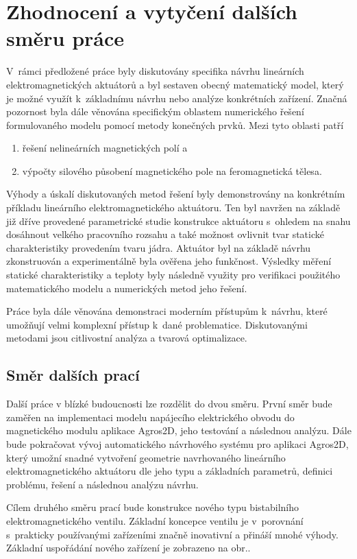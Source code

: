 \chapter{Zhodnocení a vytyčení dalších směru práce}
V~rámci předložené práce byly diskutovány specifika návrhu lineárních elektromagnetických aktuátorů a byl sestaven obecný matematický model, který je možné využít k~základnímu návrhu nebo analýze konkrétních zařízení. Značná pozornost byla dále věnována specifickým oblastem numerického řešení formulovaného modelu pomocí metody konečných prvků. Mezi tyto oblasti patří
\begin{enumerate}[a]
    \item řešení nelineárních magnetických polí a
    \item výpočty silového působení magnetického pole na feromagnetická tělesa.
\end{enumerate}

Výhody a úskalí diskutovaných metod řešení byly demonstrovány na konkrétním příkladu lineárního elektromagnetického aktuátoru. Ten byl navržen na základě již dříve provedené parametrické studie konstrukce aktuátoru s~ohledem na snahu dosáhnout velkého pracovního rozsahu a také možnost ovlivnit tvar statické charakteristiky provedením tvaru jádra. Aktuátor byl na základě návrhu zkonstruován a experimentálně byla ověřena jeho funkčnost. Výsledky měření statické charakteristiky a teploty byly následně využity pro verifikaci použitého matematického modelu a numerických metod jeho řešení.

Práce byla dále věnována demonstraci moderním přístupům k~návrhu, které umožňují velmi komplexní přístup k~dané problematice. Diskutovanými metodami jsou citlivostní analýza a tvarová optimalizace.

\section{Směr dalších prací}
Další práce v blízké budoucnosti lze rozdělit do dvou směru. První směr bude zaměřen na implementaci modelu napájecího elektrického obvodu do magnetického modulu aplikace Agros2D, jeho testování a následnou analýzu. Dále bude pokračovat vývoj automatického návrhového systému pro aplikaci Agros2D, který umožní snadné vytvoření geometrie navrhovaného lineárního elektromagnetického aktuátoru dle jeho typu a základních parametrů, definici problému, řešení a následnou analýzu návrhu.

Cílem druhého směru prací bude konstrukce nového typu bistabilního elektromagnetického ventilu. Základní koncepce ventilu je v~porovnání s~prakticky používanými zařízeními značně inovativní a přináší mnohé výhody. Základní uspořádání nového zařízení je zobrazeno na obr..

